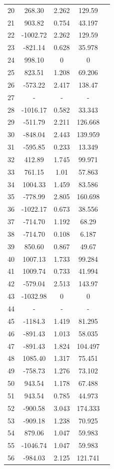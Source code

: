 {\begin{longtable}{ccccc}
20 & 268.30 & 2.262 & 129.59 \\
21 & 903.82 & 0.754 & 43.197 \\
22 & -1002.72 & 2.262 & 129.59 \\
23 & -821.14 & 0.628 & 35.978 \\
24 & 998.10 & 0 & 0 \\
25 & 823.51 & 1.208 & 69.206 \\
26 & -573.22 & 2.417 & 138.47 \\
27 & - & - & - \\
28 & -1016.17 & 0.582 & 33.343 \\
29 & -511.79 & 2.211 & 126.668 \\
30 & -848.04 & 2.443 & 139.959 \\
31 & -595.85 & 0.233 & 13.349 \\
32 & 412.89 & 1.745 & 99.971 \\
33 & 761.15 & 1.01 & 57.863 \\
34 & 1004.33 & 1.459 & 83.586 \\
35 & -778.99 & 2.805 & 160.698 \\
36 & -1022.17 & 0.673 & 38.556 \\
37 & -714.70 & 1.192 & 68.29 \\
38 & -714.70 & 0.108 & 6.187 \\
39 & 850.60 & 0.867 & 49.67 \\
40 & 1007.13 & 1.733 & 99.284 \\
41 & 1009.74 & 0.733 & 41.994 \\
42 & -579.04 & 2.513 & 143.97 \\
43 & -1032.98 & 0 & 0 \\
44 & - & - & - \\
45 & -1184.3 & 1.419 & 81.295 \\
46 & -891.43 & 1.013 & 58.035 \\
47 & -891.43 & 1.824 & 104.497 \\
48 & 1085.40 & 1.317 & 75.451 \\
49 & -758.73 & 1.276 & 73.102 \\
50 & 943.54 & 1.178 & 67.488 \\
51 & 943.54 & 0.785 & 44.973 \\
52 & -900.58 & 3.043 & 174.333 \\
53 & -909.18 & 1.238 & 70.925 \\
54 & 879.06 & 1.047 & 59.983 \\
55 & -1046.74 & 1.047 & 59.983 \\
56 & -984.03 & 2.125 & 121.741 \\

\end{longtable}}
